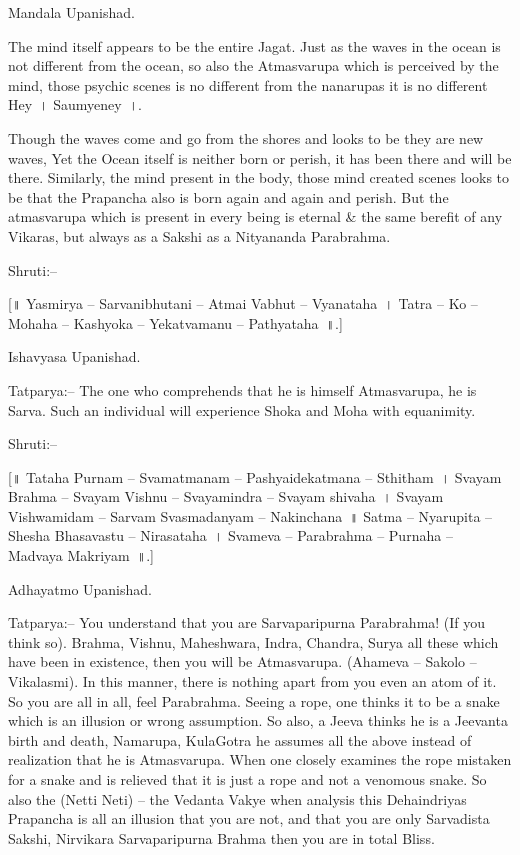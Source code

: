 Mandala Upanishad.

The mind itself appears to be the entire Jagat. Just as the waves in the ocean is not different from the ocean, so also the Atmasvarupa which is perceived by the mind, those psychic scenes is no different from the nanarupas it is no different Hey~। Saumyeney~।.

Though the waves come and go from the shores and looks to be they are new waves, Yet the Ocean itself is neither born or perish, it has been there and will be there. Similarly, the mind present in the body, those mind created scenes looks to be that the Prapancha also is born again and again and perish. But the atmasvarupa which is present in every being is eternal \& the same berefit of any Vikaras, but always as a Sakshi as a Nityananda Parabrahma.

Shruti:–

[॥ Yasmirya – Sarvanibhutani – Atmai Vabhut – Vyanataha~। Tatra – Ko – Mohaha – Kashyoka – Yekatvamanu – Pathyataha~॥.]

Ishavyasa Upanishad.

Tatparya:– The one who comprehends that he is himself Atmasvarupa, he is Sarva. Such an individual will experience Shoka and Moha with equanimity.

Shruti:–

[॥ Tataha Purnam – Svamatmanam – Pashyaidekatmana – Sthitham~। Svayam Brahma – Svayam Vishnu – Svayamindra – Svayam shivaha~। Svayam Vishwamidam – Sarvam Svasmadanyam – Nakinchana~॥ Satma – Nyarupita – Shesha Bhasavastu – Nirasataha~। Svameva – Parabrahma – Purnaha – Madvaya Makriyam~॥.]

Adhayatmo Upanishad.

Tatparya:– You understand that you are Sarvaparipurna Parabrahma! (If you think so). Brahma, Vishnu, Maheshwara, Indra, Chandra, Surya all these which have been in existence, then you will be Atmasvarupa. (Ahameva – Sakolo – Vikalasmi). In this manner, there is nothing apart from you even an atom of it. So you are all in all, feel Parabrahma. Seeing a rope, one thinks it to be a snake which is an illusion or wrong assumption. So also, a Jeeva thinks he is a Jeevanta birth and death, Namarupa, KulaGotra he assumes all the above instead of realization that he is Atmasvarupa. When one closely examines the rope mistaken for a snake and is relieved that it is just a rope and not a venomous snake. So also the (Netti Neti) – the Vedanta Vakye when analysis this Dehaindriyas Prapancha is all an illusion that you are not, and that you are only Sarvadista Sakshi, Nirvikara Sarvaparipurna Brahma then you are in total Bliss.

